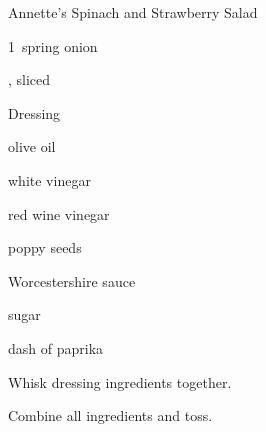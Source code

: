 \begin{recipe}{Annette's Spinach and Strawberry Salad}{}{}

\begin{ingredients}
\item 1~spring onion
\item {}, sliced
\item {}
\end{ingredients}

Dressing
\begin{ingredients}
\item \C{\half} olive oil
\item {} white vinegar
\item {} red wine vinegar
\item {} poppy seeds
\item {} Worcestershire sauce
\item \C{\quarter} sugar
\item dash of paprika
\end{ingredients}

\begin{directions}
\item Whisk dressing ingredients together.
\item Combine all ingredients and toss.
\end{directions}

\end{recipe}
